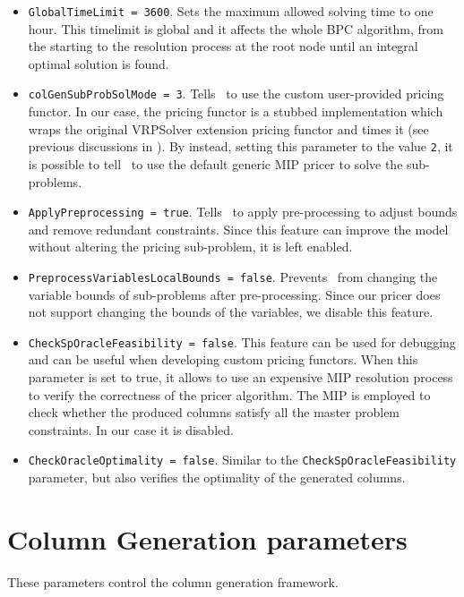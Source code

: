 \begin{itemize}
	\item \texttt{GlobalTimeLimit = 3600}.
	      Sets the maximum allowed solving time to one hour.
	      This timelimit is global and it affects the whole BPC algorithm, from the starting
	      to the resolution process at the root node until an integral optimal solution is found.
	\item \texttt{colGenSubProbSolMode = 3}.
	      Tells \bapcod\ to use the custom user-provided pricing functor.
	      In our case, the pricing functor is a stubbed implementation which wraps the original VRPSolver extension pricing functor
	      and times it (see previous discussions in ).
	      By instead, setting this parameter to the value \texttt{2},
	      it is possible to tell \bapcod\ to use the default generic MIP pricer to solve the sub-problems.
	\item \texttt{ApplyPreprocessing = true}.
	      Tells \bapcod\ to apply pre-processing to adjust bounds and remove redundant constraints.
	      Since this feature can improve the model without altering the pricing sub-problem,
	      it is left enabled.
	\item \texttt{PreprocessVariablesLocalBounds = false}.
	      Prevents \bapcod\ from changing the variable bounds of sub-problems after pre-processing.
	      Since our pricer does not support changing the bounds of the variables,
	      we disable this feature.
	\item \texttt{CheckSpOracleFeasibility = false}.
	      This feature can be used for debugging and can be useful when developing custom pricing functors.
	      When this parameter is set to true, it allows to use an expensive MIP resolution process
	      to verify the correctness of the pricer algorithm.
	      The MIP is employed to check whether the produced columns satisfy all the master problem constraints.
	      In our case it is disabled.
	\item \texttt{CheckOracleOptimality = false}.
	      Similar to the \texttt{CheckSpOracleFeasibility} parameter, but also verifies the optimality of the generated columns.
\end{itemize}

\section{Column Generation parameters}

These parameters control the column generation framework.

